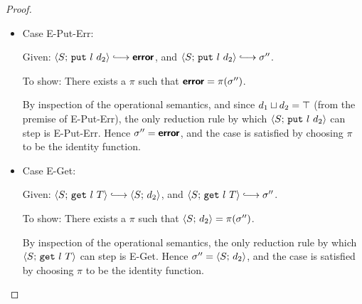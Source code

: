 \begin{proof}
\begin{itemize}
      \item Case {\sc E-Put-Err}:

      Given: $\config{S}{\putexp{l}{d_2}} \parstepsto \error$, and
      $\config{S}{\putexp{l}{d_2}} \parstepsto \conf''$.

      To show: There exists a $\pi$ such that
      $\textbf{\textsf{error}} = \pi(\sigma'')$.

      By inspection of the operational semantics, and since
      $d_1 \sqcup d_2 = \top$ (from the premise of {\sc
      E-Put-Err}), the only reduction rule by which
      $\langle S;\, \mbox{\texttt{put}}~l~d_2 \rangle$ can step is {\sc E-Put-Err}.
      Hence $\sigma'' = \textbf{\textsf{error}}$, and the case is satisfied by choosing
      $\pi$ to be the identity function.

      \item Case {\sc E-Get}:

      Given: $\config{S}{\getexp{l}{T}} \parstepsto \config{S}{d_2}$,
      and $\config{S}{\getexp{l}{T}} \parstepsto \conf''$.

      To show: There exists a $\pi$ such that $\langle S;\, d_2 \rangle =
      \pi(\sigma'')$.

      By inspection of the operational semantics, the only reduction
      rule by which $\langle S;\, \mbox{\texttt{get}}~l~T \rangle$ can step is {\sc
        E-Get}.  Hence $\sigma'' = \langle S;\, d_2 \rangle$, and the case is
      satisfied by choosing $\pi$ to be the identity function.

  \end{itemize}
\end{proof}

